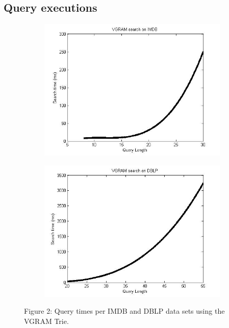 \documentclass[pdftex,12pt,letter]{article}
\begin{document}
\subsection{Query executions}
\begin{figure}[h!]
\centering
\begin{subfigure}[b]{0.45\textwidth}
\includegraphics[width=\textwidth]{VGRAMonIMDB.jpg}
\label{fig:imdb}
\end{subfigure}
\begin{subfigure}[b]{0.45\textwidth}
\includegraphics[width=\textwidth]{VGRAMonDBLP.jpg}
\label{fig:dblp}
\end{subfigure}
\begin{center}
Figure 2: Query times per IMDB and DBLP data sets using the VGRAM Trie.
\end{center}
\end{figure}
\end{document}
